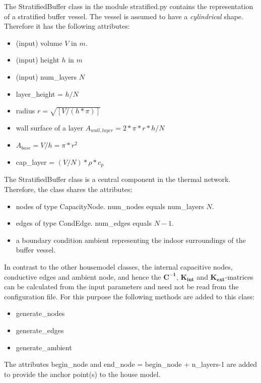 The \textsf{StratifiedBuffer} class in the module \textsf{stratified.py} contains the representation of a stratified buffer vessel. The vessel is assumed to have a \emph{cylindrical} shape. Therefore it has the following attributes:

\begin{itemize}
	\item (input) volume $V$ in $m$.
	\item (input) height $h$ in $m$
	\item (input) num\_layers $N$
	\item {layer\_height = $h / N$}
	\item radius $r = \sqrt{[V / (h * \pi)]}$
	\item wall surface of a layer $A_{wall,layer} = 2 * \pi * r * h/N$
	\item $A_{base} = V / h = \pi * r^2$
	\item cap\_layer = $(V / N) * \rho * c_p$
\end{itemize}



The \textsf{StratifiedBuffer} class is a central component in the thermal network. Therefore, the class shares the attributes:
\begin{itemize}
	\item \textsf{nodes} of type \textsf{CapacityNode}. \textsf{num\_nodes} equals num\_layers $N$.
	\item \textsf{edges} of type \textsf{CondEdge}. \textsf{num\_edges} equals $N-1$.
	\item a boundary condition \textsf{ambient} representing the indoor surroundings of the buffer vessel.
\end{itemize}

In contrast to the other \textsf{housemodel} classes, the internal capacitive nodes, conductive edges and ambient node, and hence the $\mathbf{C^{-1}}$, $\mathbf{K_{int}}$ and $\mathbf{K_{ext}}$-matrices can be calculated from the input parameters and need not be read from the configuration file. For this purpose the following methods are added to this class:

\begin{itemize}
	\item \textsf{generate\_nodes}
	\item \textsf{generate\_edges}
	\item \textsf{generate\_ambient}
\end{itemize}

The attributes \textsf{begin\_node} and \textsf{end\_node} = \textsf{begin\_node + n\_layers-1} are added to provide the anchor point(s) to the house model.


\newpage
